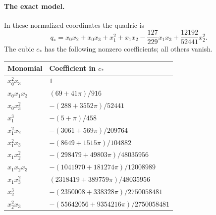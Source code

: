 \paragraph{The exact model.}
In these normalized coordinates the quadric is
\begin{equation}\label{eq:small-harmonic-quadric}
 q_*=x_0x_2+x_0x_3+x_1^2+x_1x_2
             -\frac{127}{229}x_1x_3+\frac{12192}{52441}x_2^2.
\end{equation}
The cubic $c_*$ has the following nonzero coefficients; all others
vanish.
\begin{center}
\renewcommand{\arraystretch}{1.18}
\begin{tabular}{@{}ll@{}}
\toprule
Monomial & Coefficient in $c_*$\\
\midrule
$x_0^2x_3$ & $1$\\
$x_0x_1x_3$ & $(69+41\pi)/916$\\
$x_0x_3^2$ & $-(288+3552\pi)/52441$\\
$x_1^3$ & $-(5+\pi)/458$\\
$x_1^2x_2$ & $-(3061+569\pi)/209764$\\
$x_1^2x_3$ & $-(8649+1515\pi)/104882$\\
$x_1x_2^2$ & $-(298479+49803\pi)/48035956$\\
$x_1x_2x_3$ & $-(1041970+181274\pi)/12008989$\\
$x_1x_3^2$ & $(2318419+389759\pi)/48035956$\\
$x_2^3$ & $-(2350008+338328\pi)/2750058481$\\
$x_2^2x_3$ & $-(55642056+9354216\pi)/2750058481$\\
\bottomrule
\end{tabular}
\end{center}

